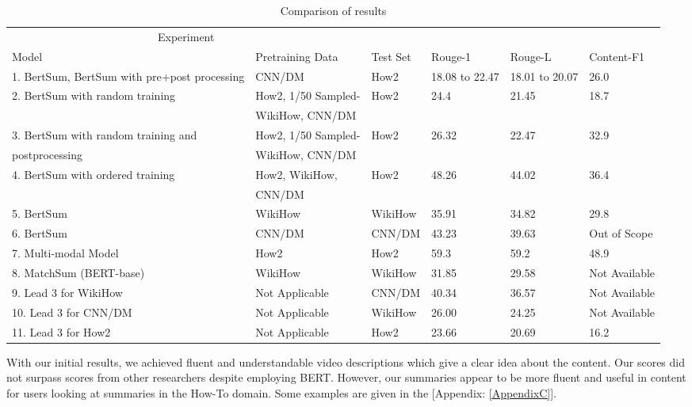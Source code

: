 \documentclass[sigconf]{acmart}
\begin{document}
\begin{table*}
\caption{Comparison of results}
\label{table1}
\centering
\begin{tabular}{llllll}
\toprule
\multicolumn{2}{c}{Experiment} \\
\cmidrule(r){1-2}
Model & Pretraining Data & Test Set & Rouge-1 &Rouge-L &Content-F1\\
\midrule
1. BertSum, BertSum with pre+post processing & CNN/DM & How2 & 18.08 to 22.47 & 18.01 to 20.07 & 26.0 \\
\midrule
2. BertSum with random training & How2, 1/50 Sampled- & How2 & 24.4 &21.45 & 18.7 \\
& WikiHow, CNN/DM &\\
\midrule
3. BertSum with random training and & How2, 1/50 Sampled- & How2 & 26.32 &22.47 & 32.9 \\
postprocessing & WikiHow, CNN/DM &\\
\midrule
4. BertSum with ordered training & How2, WikiHow, & How2 & 48.26 &44.02 & 36.4 \\
  & CNN/DM &\\
\midrule
5. BertSum & WikiHow & WikiHow & 35.91 & 34.82 & 29.8 \\
\midrule
\midrule

6. BertSum \cite{liu-lapata-2019-text} & CNN/DM & CNN/DM & 43.23 &39.63 & Out of Scope \\
\midrule
7. Multi-modal Model \cite{palaskar-etal-2019-multimodal} & How2 & How2 & 59.3 &59.2 & 48.9 \\
\midrule
8. MatchSum (BERT-base) \cite{Zhong2020ExtractiveSA} & WikiHow & WikiHow & 31.85 &29.58 & Not Available \\
\midrule
9. Lead 3 for WikiHow \cite{DBLP:journals/corr/abs-1810-09305} & Not Applicable & CNN/DM & 40.34 &36.57 & Not Available \\
\midrule
10. Lead 3 for CNN/DM \cite{DBLP:journals/corr/abs-1810-09305} & Not Applicable & WikiHow & 26.00 &24.25 & Not Available \\
\midrule
11. Lead 3 for How2 \cite{DBLP:journals/corr/abs-1810-09305}& Not Applicable & How2 & 23.66 & 20.69 & 16.2 \\
\bottomrule
\end{tabular}
\end{table*}


With our initial  results, we achieved fluent and understandable video descriptions which give a clear idea about the content. Our scores did not surpass scores from other researchers \cite{DBLP:journals/corr/abs-1811-00347} despite employing BERT. However, our summaries appear to be more fluent and useful in content for users looking at summaries in the How-To domain. Some examples are given in the [Appendix: \ref{AppendixC}].
\end{document}
